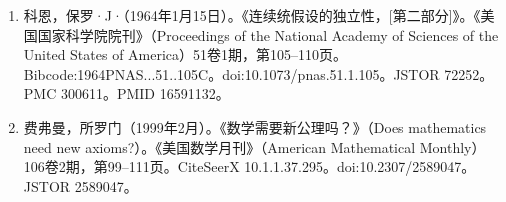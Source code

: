 \begin{enumerate}
\item 科恩，保罗·J·（1964年1月15日）。《连续统假设的独立性，[第二部分]》。《美国国家科学院院刊》（Proceedings of the National Academy of Sciences of the United States of America）51卷1期，第105–110页。Bibcode:1964PNAS...51..105C。doi:10.1073/pnas.51.1.105。JSTOR 72252。PMC 300611。PMID 16591132。
\item 费弗曼，所罗门（1999年2月）。《数学需要新公理吗？》（Does mathematics need new axioms?）。《美国数学月刊》（American Mathematical Monthly）106卷2期，第99–111页。CiteSeerX 10.1.1.37.295。doi:10.2307/2589047。JSTOR 2589047。
\end{enumerate}